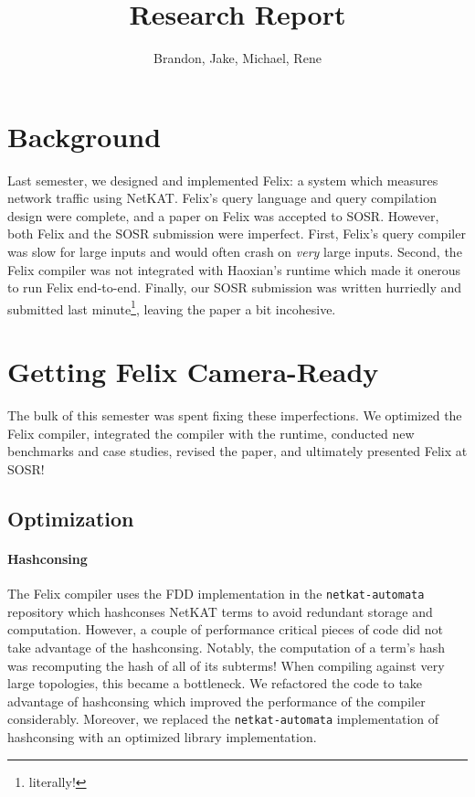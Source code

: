 \documentclass{hw}
\title{Research Report}
\author{Brandon, Jake, Michael, Rene}
\newcommand{\netauto}{\texttt{netkat-automata}}
\begin{document}
\maketitle

\section{Background}
Last semester, we designed and implemented Felix: a system which measures
network traffic using NetKAT. Felix's query language and query compilation
design were complete, and a paper on Felix was accepted to SOSR. However,
both Felix and the SOSR submission were imperfect. First, Felix's query
compiler was slow for large inputs and would often crash on \emph{very} large
inputs. Second, the Felix compiler was not integrated with Haoxian's runtime
which made it onerous to run Felix end-to-end. Finally, our SOSR submission was
written hurriedly and submitted last minute\footnote{literally!}, leaving the
paper a bit incohesive.

\section{Getting Felix Camera-Ready}
The bulk of this semester was spent fixing these imperfections. We optimized
the Felix compiler, integrated the compiler with the runtime, conducted new
benchmarks and case studies, revised the paper, and ultimately presented Felix
at SOSR!

\subsection{Optimization}
\paragraph{Hashconsing}
The Felix compiler uses the FDD implementation in the \netauto{} repository
which hashconses NetKAT terms to avoid redundant storage and computation.
However, a couple of performance critical pieces of code did not take advantage
of the hashconsing. Notably, the computation of a term's hash was recomputing
the hash of all of its subterms! When compiling against very large topologies,
this became a bottleneck. We refactored the code to take advantage of
hashconsing which improved the performance of the compiler considerably.
Moreover, we replaced the \netauto{} implementation of hashconsing with an
optimized library implementation.
\end{document}
